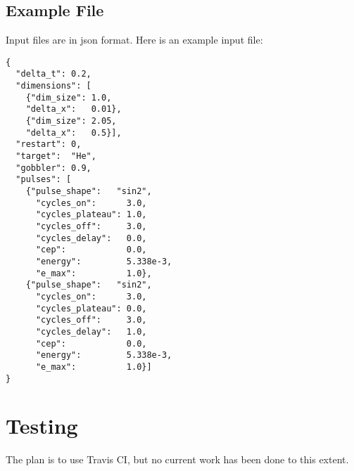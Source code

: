 \documentclass{article}
\begin{document}
\subsection{Example File} %
\label{sub:example_file}
Input files are in json format. Here is an example input file:
\begin{verbatim}
{
  "delta_t": 0.2, 
  "dimensions": [
    {"dim_size": 1.0,
    "delta_x":   0.01},
    {"dim_size": 2.05,
    "delta_x":   0.5}],
  "restart": 0,
  "target":  "He",
  "gobbler": 0.9,
  "pulses": [
    {"pulse_shape":   "sin2",
      "cycles_on":      3.0,
      "cycles_plateau": 1.0,
      "cycles_off":     3.0,
      "cycles_delay":   0.0,
      "cep":            0.0,
      "energy":         5.338e-3,
      "e_max":          1.0},
    {"pulse_shape":   "sin2",
      "cycles_on":      3.0,
      "cycles_plateau": 0.0,
      "cycles_off":     3.0,
      "cycles_delay":   1.0,
      "cep":            0.0,
      "energy":         5.338e-3,
      "e_max":          1.0}]
}
\end{verbatim}


\section{Testing} %
\label{sec:testing}
The plan is to use Travis CI, but no current work has been done to this extent.
\end{document}
